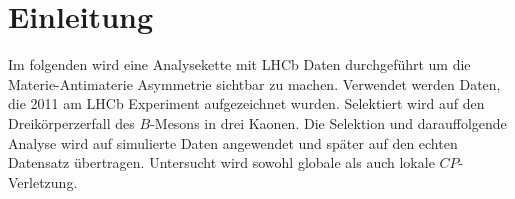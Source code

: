 \section{Einleitung}
\label{sec:einleitung}
Im folgenden wird eine Analysekette mit LHCb Daten durchgef\"uhrt um die Materie-Antimaterie Asymmetrie sichtbar zu machen.
Verwendet werden Daten, die 2011 am LHCb Experiment aufgezeichnet wurden. Selektiert wird auf den 
Dreikörperzerfall des $B$-Mesons in drei Kaonen. Die Selektion und darauffolgende 
Analyse wird auf simulierte Daten angewendet und später auf den echten 
Datensatz übertragen. Untersucht wird sowohl globale als auch lokale $CP$-Verletzung.